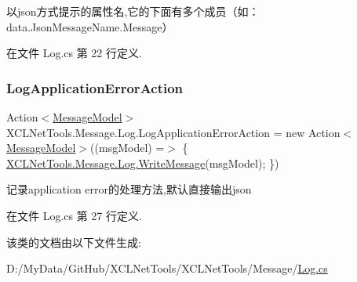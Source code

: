 以json方式提示的属性名,它的下面有多个成员（如：data.\+Json\+Message\+Name.\+Message） 



在文件 Log.\+cs 第 22 行定义.

\mbox{\label{class_x_c_l_net_tools_1_1_message_1_1_log_aeb571cf7294cbdc7776e44c5654b28d4}} 
\subsubsection{\texorpdfstring{Log\+Application\+Error\+Action}{LogApplicationErrorAction}}
{\footnotesize\ttfamily Action$<$\hyperlink{class_x_c_l_net_tools_1_1_message_1_1_message_model}{Message\+Model}$>$ X\+C\+L\+Net\+Tools.\+Message.\+Log.\+Log\+Application\+Error\+Action = new Action$<$\hyperlink{class_x_c_l_net_tools_1_1_message_1_1_message_model}{Message\+Model}$>$((msg\+Model) =$>$ \{ \hyperlink{class_x_c_l_net_tools_1_1_message_1_1_log_aac683d4043b6c9ac98f74d5f95dfa6f0}{X\+C\+L\+Net\+Tools.\+Message.\+Log.\+Write\+Message}(msg\+Model); \})\hspace{0.3cm}{\ttfamily [static]}}



记录application error的处理方法,默认直接输出json 



在文件 Log.\+cs 第 27 行定义.



该类的文档由以下文件生成\+:\begin{DoxyCompactItemize}
\item 
D\+:/\+My\+Data/\+Git\+Hub/\+X\+C\+L\+Net\+Tools/\+X\+C\+L\+Net\+Tools/\+Message/\hyperlink{_log_8cs}{Log.\+cs}\end{DoxyCompactItemize}
